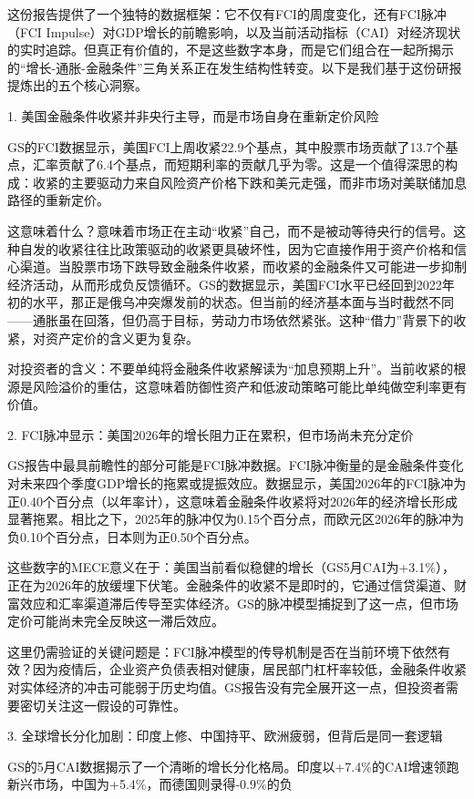 \documentclass[11pt]{ctexart}
\begin{document}
这份报告提供了一个独特的数据框架：它不仅有FCI的周度变化，还有FCI脉冲（FCI Impulse）对GDP增长的前瞻影响，以及当前活动指标（CAI）对经济现状的实时追踪。但真正有价值的，不是这些数字本身，而是它们组合在一起所揭示的“增长-通胀-金融条件”三角关系正在发生结构性转变。以下是我们基于这份研报提炼出的五个核心洞察。

1. 美国金融条件收紧并非央行主导，而是市场自身在重新定价风险

GS的FCI数据显示，美国FCI上周收紧22.9个基点，其中股票市场贡献了13.7个基点，汇率贡献了6.4个基点，而短期利率的贡献几乎为零。这是一个值得深思的构成：收紧的主要驱动力来自风险资产价格下跌和美元走强，而非市场对美联储加息路径的重新定价。

这意味着什么？意味着市场正在主动“收紧”自己，而不是被动等待央行的信号。这种自发的收紧往往比政策驱动的收紧更具破坏性，因为它直接作用于资产价格和信心渠道。当股票市场下跌导致金融条件收紧，而收紧的金融条件又可能进一步抑制经济活动，从而形成负反馈循环。GS的数据显示，美国FCI水平已经回到2022年初的水平，那正是俄乌冲突爆发前的状态。但当前的经济基本面与当时截然不同——通胀虽在回落，但仍高于目标，劳动力市场依然紧张。这种“借力”背景下的收紧，对资产定价的含义更为复杂。

对投资者的含义：不要单纯将金融条件收紧解读为“加息预期上升”。当前收紧的根源是风险溢价的重估，这意味着防御性资产和低波动策略可能比单纯做空利率更有价值。

2. FCI脉冲显示：美国2026年的增长阻力正在累积，但市场尚未充分定价

GS报告中最具前瞻性的部分可能是FCI脉冲数据。FCI脉冲衡量的是金融条件变化对未来四个季度GDP增长的拖累或提振效应。数据显示，美国2026年的FCI脉冲为正0.40个百分点（以年率计），这意味着金融条件收紧将对2026年的经济增长形成显著拖累。相比之下，2025年的脉冲仅为0.15个百分点，而欧元区2026年的脉冲为负0.10个百分点，日本则为正0.50个百分点。

这些数字的MECE意义在于：美国当前看似稳健的增长（GS5月CAI为+3.1\%），正在为2026年的放缓埋下伏笔。金融条件的收紧不是即时的，它通过信贷渠道、财富效应和汇率渠道滞后传导至实体经济。GS的脉冲模型捕捉到了这一点，但市场定价可能尚未完全反映这一滞后效应。

这里仍需验证的关键问题是：FCI脉冲模型的传导机制是否在当前环境下依然有效？因为疫情后，企业资产负债表相对健康，居民部门杠杆率较低，金融条件收紧对实体经济的冲击可能弱于历史均值。GS报告没有完全展开这一点，但投资者需要密切关注这一假设的可靠性。

3. 全球增长分化加剧：印度上修、中国持平、欧洲疲弱，但背后是同一套逻辑

GS的5月CAI数据揭示了一个清晰的增长分化格局。印度以+7.4\%的CAI增速领跑新兴市场，中国为+5.4\%，而德国则录得-0.9\%的负
\end{document}
